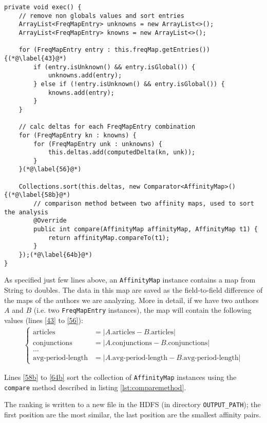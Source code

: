 \documentclass[a4paper,11pt, twoside]{article}
\begin{document}
 	\begin{lstlisting}[firstnumber=38]
private void exec() {
	// remove non globals values and sort entries
	ArrayList<FreqMapEntry> unknowns = new ArrayList<>();
	ArrayList<FreqMapEntry> knowns = new ArrayList<>();
	
	for (FreqMapEntry entry : this.freqMap.getEntries()) {(*@\label{43}@*)
		if (entry.isUnknown() && entry.isGlobal()) {
			unknowns.add(entry);
		} else if (!entry.isUnknown() && entry.isGlobal()) {
			knowns.add(entry);
		}
	}
	
	// calc deltas for each FreqMapEntry combination
	for (FreqMapEntry kn : knowns) {
		for (FreqMapEntry unk : unknowns) {
			this.deltas.add(computedDelta(kn, unk));
		}
	}(*@\label{56}@*)
	
	Collections.sort(this.deltas, new Comparator<AffinityMap>() {(*@\label{58b}@*)
		// comparison method between two affinity maps, used to sort the analysis
		@Override
		public int compare(AffinityMap affinityMap, AffinityMap t1) {
			return affinityMap.compareTo(t1);
		}
	});(*@\label{64b}@*)
}
 	\end{lstlisting}
 	
 	\bigskip
 	\noindent
	As specified just few lines above, an \lstinline|AffinityMap| instance contains a map from String to doubles. The data in this map are saved as the field-to-field difference of the maps of the authors we are analyzing. More in detail, if we have two authors $A$ and $B$ (i.e. two \lstinline|FreqMapEntry| instances), the map will contain the following values (lines \ref{43} to \ref{56}):
	\begin{align*}
		\begin{cases}
			\text{articles} &= |A.\text{articles} - B.\text{articles}| \\
			\text{conjunctions} &= |A. \text{conjunctions}- B.\text{conjunctions}| \\
			\dots& \\
			\text{avg-period-length}&= |A.\text{avg-period-length} - B.\text{avg-period-length}|
		\end{cases}
	\end{align*}
	
	\noindent
	Lines \ref{58b} to \ref{64b} sort the collection of \lstinline|AffinityMap| instances using the \lstinline|compare| method described in listing \ref{lst:comparemethod}.
	
	\noindent
	The ranking is written to a new file in the HDFS (in directory \lstinline|OUTPUT_PATH|); the first position are the most similar, the last position are the smallest affinity pairs.
	
\end{document}
